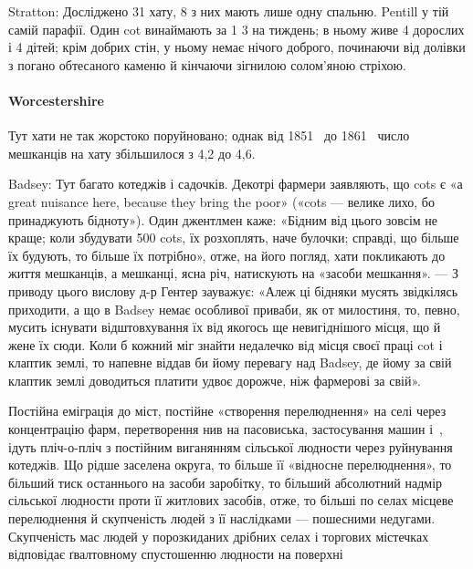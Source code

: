 Stratton: Досліджено 31 хату, 8 з них мають лише одну
спальню. Pentill у тій самій парафії. Один cot винаймають за
1 3 на тиждень; в ньому живе 4 дорослих і 4 дітей;
крім добрих стін, у ньому немає нічого доброго, починаючи від
долівки з погано обтесаного каменю й кінчаючи зігнилою солом’яною
стріхою.

\paragraph{Worcestershire}

Тут хати не так жорстоко поруйновано; однак від 1851~ до
1861~ число мешканців на хату збільшилося з 4,2 до 4,6.

Badsey: Тут багато котеджів і садочків. Декотрі фармери
заявляють, що cots є «а great nuisance here, because they bring
the poor» («cots — велике лихо, бо принаджують бідноту»).
Один джентлмен каже: «Бідним від цього зовсім не краще; коли
збудувати 500 cots, їх розхоплять, наче булочки; справді, що
більше їх будують, то більше їх потрібно», отже, на його погляд,
хати покликають до життя мешканців, а мешканці, ясна річ,
натискують на «засоби мешкання». — З приводу цього вислову
д-р Гентер зауважує: «Алеж ці бідняки мусять звідкілясь
приходити, а що в Badsey немає особливої приваби, як от милостиня,
то, певно, мусить існувати відштовхування їх від якогось
ще невигіднішого місця, що й жене їх сюди. Коли б кожний міг
знайти недалечко від місця своєї праці cot і клаптик землі, то
напевне віддав би йому перевагу над Badsey, де йому за свій
клаптик землі доводиться платити удвоє дорожче, ніж фармерові
за свій».

Постійна еміграція до міст, постійне «створення перелюднення»
на селі через концентрацію фарм, перетворення нив на пасовиська,
застосування машин і~, ідуть пліч-о-пліч з постійним
виганянням сільської людности через руйнування котеджів.
Що рідше заселена округа, то більше її «відносне перелюднення»,
то більший тиск останнього на засоби заробітку, то більший
абсолютний надмір сільської людности проти її житлових
засобів, отже, то більші по селах місцеве перелюднення й скупченість
людей з її наслідками — пошесними недугами. Скупченість
мас людей у порозкиданих дрібних селах і торгових містечках
відповідає ґвалтовному спустошенню людности на поверхні
\parbreak{}  %
